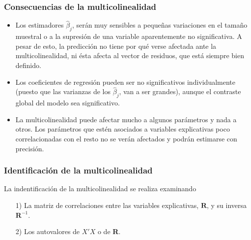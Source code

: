 \subsubsection{Consecuencias de la multicolinealidad}

\begin{itemize}
    \item Los estimadores $\widehat{\beta}_j$, serán muy sensibles a pequeñas variaciones en el tamaño muestral o a la supresión de una variable aparentemente no significativa. A pesar de esto, la predicción no tiene por qué verse afectada ante la multicolinealidad, ni ésta afecta al vector de residuos, que está siempre bien definido.
    \item Los coeficientes de regresión pueden ser no significativos individualmente (puesto que las varianzas de los $\widehat{\beta}_j$, van a ser grandes), aunque el contraste global del modelo sea significativo.
    \item La multicolinealidad puede afectar mucho a algunos parámetros y nada a otros. Los parámetros que estén asociados a variables explicativas poco correlacionadas con el resto no se verán afectados y podrán estimarse con precisión.
\end{itemize}

\subsubsection{Identificación de la multicolinealidad}
\noindent La indentificación de la multicolinealidad se realiza examinando
\begin{enumerate}
    \item[1)] La matriz de correlaciones entre las variables explicativas, $\textbf{R}$, y su inversa $\textbf{R}^{-1}$.
    \item[2)] Los autovalores de $X'X$ o de \textbf{R}.
\end{enumerate}


